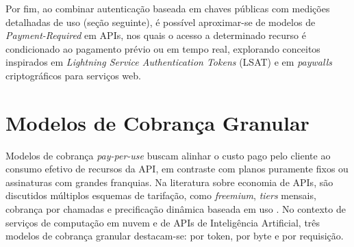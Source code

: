 \documentclass[openright]{normas-utf-tex}
\begin{document}
Por fim, ao combinar autenticação baseada em chaves públicas com medições detalhadas de uso (seção seguinte), é possível aproximar-se de modelos de \textit{Payment-Required} em APIs, nos quais o acesso a determinado recurso é condicionado ao pagamento prévio ou em tempo real, explorando conceitos inspirados em \textit{Lightning Service Authentication Tokens} (LSAT) e em \textit{paywalls} criptográficos para serviços web.

\section{Modelos de Cobrança Granular}

Modelos de cobrança \textit{pay-per-use} buscam alinhar o custo pago pelo cliente ao consumo efetivo de recursos da API, em contraste com planos puramente fixos ou assinaturas com grandes franquias. Na literatura sobre economia de APIs, são discutidos múltiplos esquemas de tarifação, como \textit{freemium}, \textit{tiers} mensais, cobrança por chamadas e precificação dinâmica baseada em uso \cite{rozik2022apieconomy}. No contexto de serviços de computação em nuvem e de APIs de Inteligência Artificial, três modelos de cobrança granular destacam-se: por token, por byte e por requisição.
\end{document}
